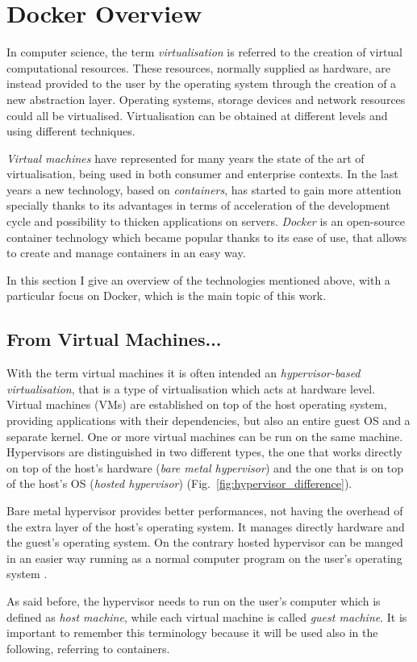 \documentclass[a4paper,12pt]{article}
\def\myfig#1{Fig.~#1\xspace}
\begin{document}
\newpage

\section{Docker Overview}
\label{sec:docker_overview}

In computer science, the term \textit{virtualisation}
\cite{wikipedia_virtualization} is referred to the creation of virtual
computational resources. These resources, normally supplied as hardware, are
instead provided to the user by the operating system through the creation of a
new abstraction layer. Operating systems, storage devices and network resources
could all be virtualised. Virtualisation can be obtained at different levels and
using different techniques. \par\textit{Virtual machines} have represented for
many years the state of the art of virtualisation, being used in both consumer
and enterprise contexts. In the last years a new technology, based on
\textit{containers}, has started to gain more attention specially thanks to its
advantages in terms of acceleration of the development cycle and possibility to
thicken applications on servers. \textit{Docker} is an open-source container
technology which became popular thanks to its ease of use, that allows to
create and manage containers in an easy way. \par In this section I give an
overview of the technologies mentioned above, with a particular focus on Docker,
which is the main topic of this work.

\subsection{From Virtual Machines...}

With the term virtual machines it is often intended an \textit{hypervisor-based
virtualisation}, that is a type of virtualisation which acts at hardware level.
Virtual machines (VMs) are established on top of the host operating system,
providing applications with their dependencies, but also an entire guest OS and
a separate kernel. One or more virtual machines can be run on the same machine.
Hypervisors are distinguished in two different types, the one that works
directly on top of the host's hardware (\textit{bare metal hypervisor}) and the
one that is on top of the host's OS (\textit{hosted hypervisor})
(\myfig{\ref{fig:hypervisor_difference}}). \par Bare metal hypervisor provides
better performances, not having the overhead of the extra layer of the host's
operating system. It manages directly hardware and the guest's operating system.
On the contrary hosted hypervisor can be manged in an easier way running as a
normal computer program on the user's operating system
\cite[Sec.~2]{bui_docker_security}. \par As said before, the hypervisor needs to
run on the user's computer which is defined as \textit{host machine}, while each
virtual machine is called \textit{guest machine}. It is important to remember
this terminology because it will be used also in the following, referring to
containers. 
\end{document}
